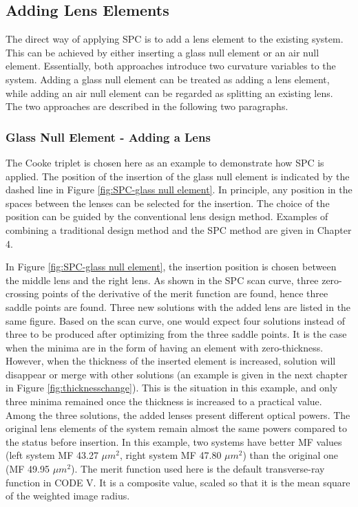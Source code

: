 \subsection{Adding Lens Elements}
The direct way of applying SPC is to add a lens element to the existing system. This can be achieved by either inserting a glass null element or an air null element. Essentially, both approaches introduce two curvature variables to the system. Adding a glass null element can be treated as adding a lens element, while adding an air null element can be regarded as splitting an existing lens. The two approaches are described in the following two paragraphs.

\subsubsection{Glass Null Element - Adding a Lens}
The Cooke triplet is chosen here as an example to demonstrate how SPC is applied. 
The position of the insertion of the glass null element is indicated by the dashed line in Figure \ref{fig:SPC-glass null element}. In principle, any position in the spaces between the lenses can be selected for the insertion. The choice of the position can be guided by the conventional lens design method. Examples of combining a traditional design method and the SPC method are given in Chapter 4.

In Figure \ref{fig:SPC-glass null element}, the insertion position is chosen between the middle lens and the right lens. As shown in the SPC scan curve, three zero-crossing points of the derivative of the merit function are found, hence three saddle points are found. Three new solutions with the added lens are listed in the same figure. Based on the scan curve, one would expect four solutions instead of three to be produced after optimizing from the three saddle points. It is the case when the minima are in the form of having an element with zero-thickness. However, when the thickness of the inserted element is increased, solution will disappear or merge with other solutions (an example is given in the next chapter in Figure \ref{fig:thicknesschange}). This is the situation in this example, and only three minima remained once the thickness is increased to a practical value. Among the three solutions, the added lenses present different optical powers. The original lens elements of the system remain almost the same powers compared to the status before insertion. In this example, two systems have better MF values (left system MF 43.27 $\mu m^2$, right system MF 47.80 $\mu m^2$) than the original one (MF 49.95 $\mu m^2$). The merit function used here is the default transverse-ray function in CODE V. It is a composite value, scaled so that it is the mean square of the weighted image radius.

